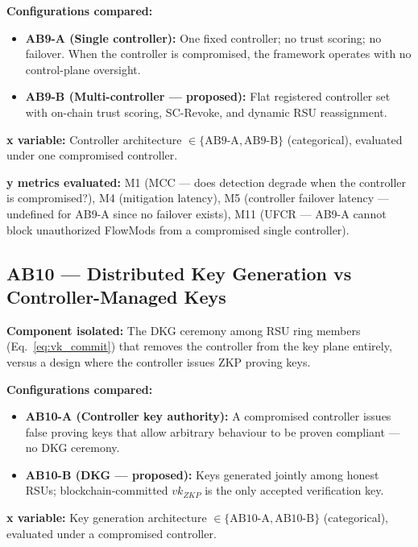 \documentclass[12pt, a4paper]{report}
\begin{document}
{{\textbf{Configurations compared:}
\begin{itemize}
    \item \textbf{AB9-A (Single controller):}
    One fixed controller; no trust scoring; no failover.
    When the controller is compromised, the framework
    operates with no control-plane oversight.
    \item \textbf{AB9-B (Multi-controller —
    proposed):} Flat registered controller set with
    on-chain trust scoring, SC-Revoke, and dynamic
    RSU reassignment.
\end{itemize}

\textbf{x variable:} Controller architecture
$\in \{\text{AB9-A}, \text{AB9-B}\}$ (categorical),
evaluated under one compromised controller.

\textbf{y metrics evaluated:} M1 (MCC — does detection
degrade when the controller is compromised?), M4
(mitigation latency), M5 (controller failover latency —
undefined for AB9-A since no failover exists), M11
(UFCR — AB9-A cannot block unauthorized FlowMods from
a compromised single controller).


\subsection{AB10 — Distributed Key Generation vs
Controller-Managed Keys}
\label{sec:ab10}

\textbf{Component isolated:}
The \ac{DKG} ceremony among \ac{RSU} ring members
(Eq.~\ref{eq:vk_commit}) that removes the controller
from the key plane entirely, versus a design where
the controller issues \ac{ZKP} proving keys.

\textbf{Configurations compared:}
\begin{itemize}
    \item \textbf{AB10-A (Controller key authority):}
    A compromised controller issues false proving keys
    that allow arbitrary behaviour to be proven
    compliant — no \ac{DKG} ceremony.
    \item \textbf{AB10-B (\ac{DKG} — proposed):}
    Keys generated jointly among honest \ac{RSU}s;
    blockchain-committed $vk_{ZKP}$ is the only
    accepted verification key.
\end{itemize}

\textbf{x variable:} Key generation architecture
$\in \{\text{AB10-A}, \text{AB10-B}\}$ (categorical),
evaluated under a compromised controller.

}}
\end{document}
